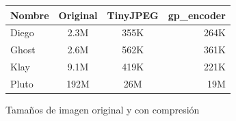 \begin{figure}[h]
    \begin{tabular}{|l c c r|}
        \hline
        Nombre & Original & TinyJPEG & gp\_encoder \\
        \hline
        Diego & 2.3M & 355K & 264K \\
        Ghost & 2.6M & 562K & 361K \\
        Klay  & 9.1M & 419K & 221K \\
        Pluto & 192M & 26M  & 19M  \\
        \hline
    \end{tabular}
    \caption{Tamaños de imagen original y con compresión}
    \label{fig:size-table}
\end{figure}


